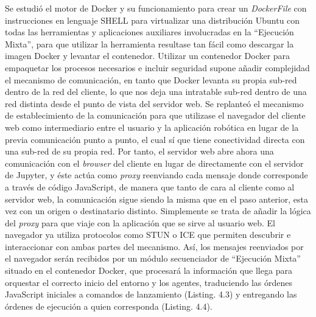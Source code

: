 Se estudió el motor de Docker y su funcionamiento para crear un \textit{DockerFile} con instrucciones en lenguaje SHELL para virtualizar una distribución Ubuntu con todas las herramientas y aplicaciones auxiliares involucradas en la ``Ejecución Mixta'', para que utilizar la herramienta resultase tan fácil como descargar la imagen Docker y levantar el contenedor. Utilizar un contenedor Docker para empaquetar los procesos necesarios e incluir seguridad supone añadir complejidad el mecanismo de comunicación, en tanto que Docker levanta su propia sub-red dentro de la red del cliente, lo que nos deja una intratable sub-red dentro de una red distinta desde el punto de vista del servidor web. Se replanteó el mecanismo de establecimiento de la comunicación para que utilizase el navegador del cliente web como intermediario entre el usuario y la aplicación robótica en lugar de la previa comunicación punto a punto, el cual sí que tiene conectividad directa con una sub-red de su propia red. Por tanto, el servidor web abre ahora una comunicación con el \textit{browser} del cliente en lugar de directamente con el servidor de Jupyter, y éste actúa como \textit{proxy} reenviando cada mensaje donde corresponde a través de código JavaScript, de manera que tanto de cara al cliente como al servidor web, la comunicación sigue siendo la misma que en el paso anterior, esta vez con un origen o destinatario distinto. Simplemente se trata de añadir la lógica del \textit{proxy} para que viaje con la aplicación que se sirve al usuario web. El navegador ya utiliza protocolos como STUN o ICE que permiten descubrir e interaccionar con ambas partes del mecanismo. Así, los mensajes reenviados por el navegador serán recibidos por un módulo secuenciador de ``Ejecución Mixta'' situado en el contenedor Docker, que procesará la información que llega para orquestar el correcto inicio del entorno y los agentes, traduciendo las órdenes JavaScript iniciales a comandos de lanzamiento (Listing. 4.3) y entregando las órdenes de ejecución a quien corresponda (Listing. 4.4).

